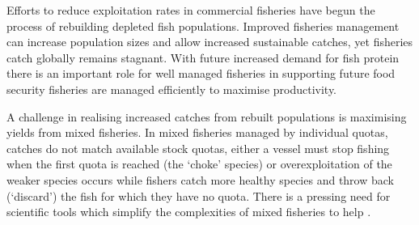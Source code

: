 \documentclass{nature}
\begin{document}
\begin{linenumbers}
 Efforts to reduce exploitation rates in commercial fisheries
have begun the process of rebuilding depleted fish populations\cite{Worm2009}.
Improved fisheries management can increase
population sizes and allow increased sustainable catches, yet fisheries catch
globally remains stagnant\cite{FAO2016}. With future increased demand for fish
protein there is an important role for well managed
fisheries in supporting future food
security\cite{Mcclanahan2015}
fisheries are
managed efficiently to maximise productivity.

A challenge in realising increased catches
from rebuilt populations is maximising yields from mixed
fisheries\cite{Branch2008, Kuriyama2016, Ulrich2016}. In mixed
fisheries managed by
individual quotas,  catches do not match
available stock quotas, either a vessel must stop fishing when the first quota
is reached (the `choke' species) or overexploitation of the weaker species
occurs while fishers  catch more healthy species and throw
back (`discard') the fish for which they have no quota\cite{Batsleer2015}.
There is a pressing need for scientific tools which
simplify the complexities of mixed fisheries to help . 


\end{linenumbers}
\end{document}
